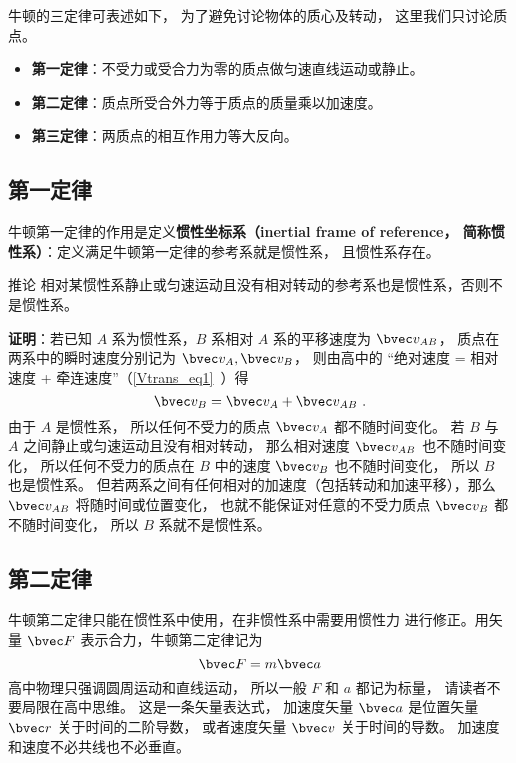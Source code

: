 

牛顿的三定律可表述如下， 为了避免讨论物体的质心及转动， 这里我们只讨论质点。
\begin{itemize}
\item \textbf{第一定律}：不受力或受合力为零的质点做匀速直线运动或静止。
\item \textbf{第二定律}：质点所受合外力等于质点的质量乘以加速度。
\item \textbf{第三定律}：两质点的相互作用力等大反向。
\end{itemize}

\subsection{第一定律}

牛顿第一定律的作用是定义\textbf{惯性坐标系（inertial frame of reference， 简称惯性系）}：定义满足牛顿第一定律的参考系就是惯性系， 且惯性系存在。

\begin{corollary}{推论}
相对某惯性系静止或匀速运动且没有相对转动的参考系也是惯性系，否则不是惯性系。
\end{corollary}
\textbf{证明}：若已知 $A$ 系为惯性系，$B$ 系相对 $A$ 系的平移速度为 $\bvec v_{AB}$， 质点在两系中的瞬时速度分别记为 $\bvec v_A, \bvec v_B$， 则由高中的 “绝对速度 = 相对速度 + 牵连速度”（\autoref{Vtrans_eq1}~）得
\begin{equation}
\bvec v_{B} = \bvec v_{A} + \bvec v_{AB}~.
\end{equation}
由于 $A$ 是惯性系， 所以任何不受力的质点 $\bvec v_{A}$ 都不随时间变化。 若 $B$ 与 $A$ 之间静止或匀速运动且没有相对转动， 那么相对速度 $\bvec v_{AB}$ 也不随时间变化， 所以任何不受力的质点在 $B$ 中的速度 $\bvec v_{B}$ 也不随时间变化， 所以 $B$ 也是惯性系。 但若两系之间有任何相对的加速度（包括转动和加速平移），那么 $\bvec v_{AB}$ 将随时间或位置变化， 也就不能保证对任意的不受力质点 $\bvec v_B$ 都不随时间变化， 所以 $B$ 系就不是惯性系。

\subsection{第二定律}
牛顿第二定律只能在惯性系中使用，在非惯性系中需要用惯性力 进行修正。用矢量 $\bvec F$ 表示合力，牛顿第二定律记为
\begin{equation}\label{New3_eq1}
\bvec F = m\bvec a
\end{equation}
高中物理只强调圆周运动和直线运动， 所以一般 $F$ 和 $a$ 都记为标量， 请读者不要局限在高中思维。 这是一条矢量表达式， 加速度矢量 $\bvec a$ 是位置矢量 $\bvec r$ 关于时间的二阶导数， 或者速度矢量 $\bvec v$ 关于时间的导数。 加速度和速度不必共线也不必垂直。

